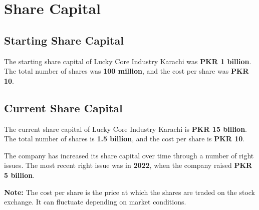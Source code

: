 \documentclass{article}
\begin{document}
\newpage









\section{Share Capital}

\vspace{22pt}
\begin{minipage}[b]{0.6\textwidth}
  \subsection{Starting Share Capital}
  The starting share capital of Lucky Core Industry Karachi was  \textbf{PKR 1 billion}. The total number of shares was  \textbf{100 million}, and the cost per share was  \textbf{PKR 10}.
  
  \subsection{Current Share Capital}
  The current share capital of Lucky Core Industry Karachi is  \textbf{PKR 15 billion}. The total number of shares is  \textbf{1.5 billion}, and the cost per share is  \textbf{PKR 10}.
  
  The company has increased its share capital over time through a number of right issues. The most recent right issue was in  \textbf{2022}, when the company raised  \textbf{PKR 5 billion}.

 \vspace{15pt}
   \textbf{Note:} The cost per share is the price at which the shares are traded on the stock exchange. It can fluctuate depending on market conditions.
\end{minipage}
\end{document}
